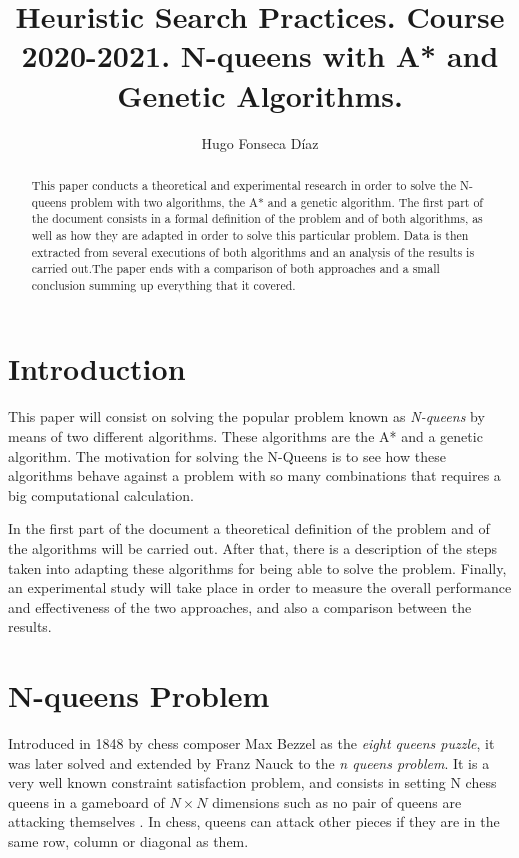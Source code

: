 \documentclass[11pt]{llncs}
\begin{document}
\title{Heuristic Search Practices. Course 2020-2021. N-queens with A* and Genetic Algorithms.}
\author{Hugo Fonseca Díaz\\ }
\maketitle
\begin{abstract}
This paper conducts a theoretical and experimental research in order to solve the N-queens problem with two algorithms, the A* and a genetic algorithm. The first part of the document consists in a formal definition of the problem and of both algorithms, as well as how they are adapted in order to solve this particular problem. Data is then extracted from several executions of both algorithms and an analysis of the results is carried out.The paper ends with a comparison of both approaches and a small conclusion summing up everything that it covered. 
\end{abstract}
\section{Introduction}\label{introduction}
This paper will consist on solving the popular problem known as \textit{N-queens} by means of two different algorithms. These algorithms are the A* and a genetic algorithm. The motivation for solving the N-Queens is to see how these algorithms behave against a problem with so many combinations that requires a big computational calculation.

In the first part of the document a theoretical definition of the problem and of the algorithms will be carried out. After that, there is a description of the steps taken into adapting these algorithms for being able to solve the problem. Finally, an experimental study will take place in order to measure the overall performance and effectiveness of the two approaches, and also a comparison between the results.
\section{N-queens Problem}\label{nqueens_problem}
Introduced in 1848 by chess composer Max Bezzel as the \textit{eight queens puzzle}, it was later solved and extended by Franz Nauck to the \textit{n queens problem}. It is a very well known constraint satisfaction problem, and consists in setting N chess queens in a gameboard of $N \times N$ dimensions such as no pair of queens are attacking themselves \cite{inteligencia_artificial}. In chess, queens can attack other pieces if they are in the same row, column or diagonal as them.
\end{document}
